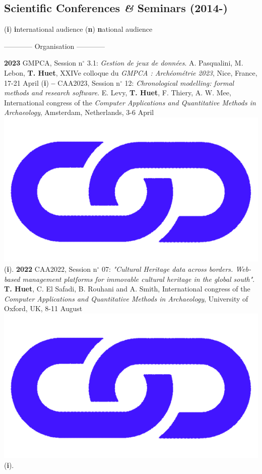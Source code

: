 \documentclass{article}
\begin{document}
\subsection*{Scientific Conferences \textit{\&} Seminars (2014-)}
\begin{center}(\textbf{i}) \textbf{i}nternational audience {\textbar} (\textbf{n}) \textbf{n}ational audience \end{center}
\smallbreak
\begin{center}------------ Organisation ------------\end{center}
\textbf{2023 }GMPCA, Session n$\mathrm{{}^\circ}$ 3.1: \textit{Gestion de jeux de données}. A. Pasqualini, M. Lebon, \textbf{T. Huet}, XXIVe colloque du \textit{GMPCA : Archéométrie 2023}, Nice, France, 17-21 April (\textbf{i})
\smallbreak
\textbf{-- }CAA2023, Session n$\mathrm{{}^\circ}$ 12: \textit{Chronological modelling: formal methods and research software}. E. Levy, \textbf{T. Huet}, F. Thiery, A. W. Mee, International congress of the \textit{Computer Applications and Quantitative Methods in Archaeology}, Amsterdam, Netherlands, 3-6 April \href{https://historical-time.github.io/caa23/s12/pres/#/title-slide}{\includegraphics[scale=0.02]{link_darkblue.png}} (\textbf{i}).
\smallbreak
\textbf{2022 }CAA2022, Session n$\mathrm{{}^\circ}$ 07: \textit{"Cultural Heritage data across borders. Web-based management platforms for immovable cultural heritage in the global south"}. \textbf{T. Huet}, C. El Safadi, B. Rouhani and A. Smith, International congress of the \textit{Computer Applications and Quantitative Methods in Archaeology}, University of Oxford, UK, 8-11 August \href{https://eamena-project.github.io/reveal.js/projects/caa22s07.html}{\includegraphics[scale=0.02]{link_darkblue.png}} (\textbf{i}). 
\end{document}
